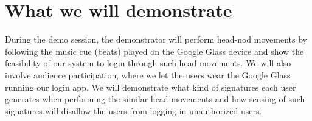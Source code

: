 \documentclass{sigchi}
\begin{document}
\section{What we will demonstrate}
During the demo session, the demonstrator will perform head-nod movements by following the music cue (beats) played on the Google Glass device and show the feasibility of our system to login through such head movements.
We will also involve audience participation, where we let the users wear the Google Glass running our login app. We will demonstrate what kind of signatures each user generates when performing the similar head movements and how sensing of such signatures will disallow the users from logging in unauthorized users.


\end{document}
